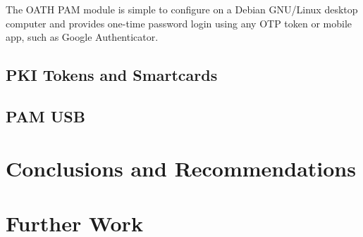 \documentclass{report}
\begin{document}
The OATH PAM module is simple to configure on a Debian GNU/Linux desktop
computer and provides one-time password login using any OTP token or mobile
app, such as Google Authenticator.



\section{PKI Tokens and Smartcards}


\section{PAM USB}

\chapter{Conclusions and Recommendations}

\chapter{Further Work}

\printbibliography
\end{document}
